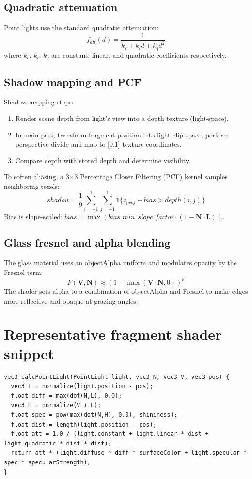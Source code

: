 \documentclass[12pt,a4paper]{report}
\begin{document}
\subsection{Quadratic attenuation}
Point lights use the standard quadratic attenuation:
\[
  f_{att}(d) = \frac{1}{k_c + k_l d + k_q d^2}
\]
where \(k_c\), \(k_l\), \(k_q\) are constant, linear, and quadratic coefficients respectively.

\subsection{Shadow mapping and PCF}
Shadow mapping steps:
\begin{enumerate}
  \item Render scene depth from light's view into a depth texture (light-space).
  \item In main pass, transform fragment position into light clip space, perform perspective divide and map to [0,1] texture coordinates.
  \item Compare depth with stored depth and determine visibility.
\end{enumerate}
To soften aliasing, a 3×3 Percentage Closer Filtering (PCF) kernel samples neighboring texels:
\[
  shadow = \frac{1}{9}\sum_{i=-1}^{1}\sum_{j=-1}^{1} \mathbf{1}\{z_{proj} - bias > depth(i,j)\}
\]
Bias is slope-scaled: \( bias = \max(bias\_min, slope\_factor \cdot (1 - \mathbf{N}\cdot\mathbf{L})) \).

\subsection{Glass fresnel and alpha blending}
The glass material uses an objectAlpha uniform and modulates opacity by the Fresnel term:
\[
  F(\mathbf{V},\mathbf{N}) \approx (1 - \max(\mathbf{V}\cdot\mathbf{N},0))^{5}
\]
The shader sets alpha to a combination of objectAlpha and Fresnel to make edges more reflective and opaque at grazing angles.

\section{Representative fragment shader snippet}
\begin{lstlisting}[style=pycode,caption={Simplified lighting calculation (GLSL-like pseudocode)}]
vec3 calcPointLight(PointLight light, vec3 N, vec3 V, vec3 pos) {
  vec3 L = normalize(light.position - pos);
  float diff = max(dot(N,L), 0.0);
  vec3 H = normalize(V + L);
  float spec = pow(max(dot(N,H), 0.0), shininess);
  float dist = length(light.position - pos);
  float att = 1.0 / (light.constant + light.linear * dist + light.quadratic * dist * dist);
  return att * (light.diffuse * diff * surfaceColor + light.specular * spec * specularStrength);
}
\end{lstlisting}
\end{document}
